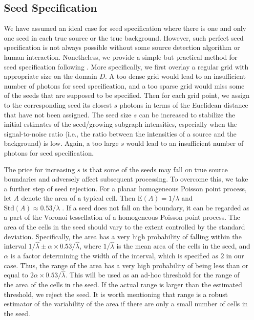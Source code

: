 \documentclass{aastex61}
\begin{document}
\subsection{Seed Specification}\label{sec:seed_spec}
We have assumed an ideal case for seed specification where there is one and only one seed in each true source or the true background. However, such perfect seed specification is not always possible without some source detection algorithm or human interaction. Nonetheless, we provide a simple but practical method for seed specification following \citet{Lee-00}. More specifically, we first overlay a regular grid with appropriate size on the domain $D$. A too dense grid would lead to an insufficient number of photons for seed specification, and a too sparse grid would miss some of the seeds that are supposed to be specified. Then for each grid point, we assign to the corresponding seed its closest $s$ photons in terms of the Euclidean distance that have not been assigned. The seed size $s$ can be increased to stabilize the initial estimates of the seed/growing subgraph intensities, especially when the signal-to-noise ratio (i.e., the ratio between the intensities of a source and the background) is low. Again, a too large $s$ would lead to an insufficient number of photons for seed specification.

The price for increasing $s$ is that some of the seeds may fall on true source boundaries and adversely affect subsequent processing. To overcome this, we take a further step of seed rejection. For a planar homogeneous Poisson point process, let $A$ denote the area of a typical cell.
Then $\mbox{E}(A)=1/\lambda$ and $\mbox{Std}(A)\approx 0.53/\lambda$ \citep[Chapter 4.2]{Moller-94}. If a seed does not fall on the boundary, it can be regarded as a part of the Voronoi tessellation of a homogeneous Poisson point process. The area 
of the cells in the seed should vary to the extent controlled by the standard deviation. Specifically, the area has a very high probability of falling within the interval $1/\hat{\lambda}\pm\alpha \times 0.53/\hat{\lambda}$, 
where $1/\hat{\lambda}$ is the mean area of the cells in the seed, and $\alpha$ is a factor determining the width of the interval, which is specified as $2$ in our case.
Thus, the range of the area has a very high probability of being less than or equal to $2\alpha \times 0.53/\hat{\lambda}$. This will be used as an ad-hoc threshold for the range of the area of the cells in the seed. If the actual range is larger than the estimated threshold, we reject the seed. It is worth mentioning that range is a robust estimator of the variability of the area if there are only a small number of cells in the seed.
\end{document}
